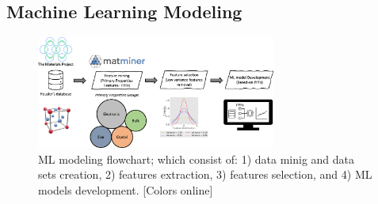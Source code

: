 \documentclass[article]{elsarticle}
\begin{document}
\subsection{Machine Learning Modeling}
\begin{figure}[H]
    \centering
    \includegraphics[width=0.7\textwidth]{Figures/FeatureEngineeringSkin.png}
    \caption{ML modeling flowchart; which consist of: 1) data minig and data sets creation, 2) features extraction, 3) features selection, and 4) ML models development. [Colors online]}
    \label{fig:MLWorkFlow}
\end{figure}
\end{document}
